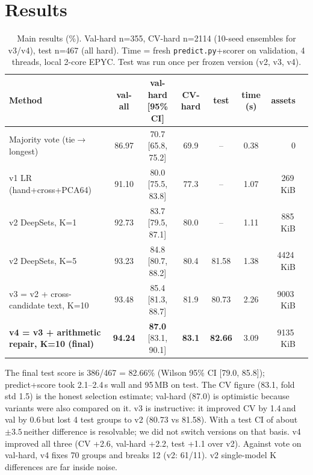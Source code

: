\documentclass[10pt,a4paper]{article}
\newcommand{\pt}{\,\text{pt}}
\begin{document}
\section{Results}
\begin{table}[h]\centering\small
\caption{Main results (\%). Val-hard n=355, CV-hard n=2114 (10-seed ensembles for v3/v4), test n=467 (all hard). Time = fresh \texttt{predict.py}+scorer on validation, 4 threads, local 2-core EPYC. Test was run once per frozen version (v2, v3, v4).}
\setlength{\tabcolsep}{4pt}\begin{tabular}{lcccccrr}\toprule
Method & val-all & val-hard [95\% CI] & CV-hard & test & time (s) & assets\\\midrule
Majority vote (tie$\to$longest) & 86.97 & 70.7 [65.8, 75.2] & 69.9 & -- & 0.38 & 0\\
v1 LR (hand+cross+PCA64) & 91.10 & 80.0 [75.5, 83.8] & 77.3 & -- & 1.07 & 269\,KiB\\
v2 DeepSets, K=1 & 92.73 & 83.7 [79.5, 87.1] & 80.0 & -- & 1.11 & 885\,KiB\\
v2 DeepSets, K=5 & 93.23 & 84.8 [80.7, 88.2] & 80.4 & 81.58 & 1.38 & 4424\,KiB\\
v3 = v2 + cross-candidate text, K=10 & 93.48 & 85.4 [81.3, 88.7] & 81.9 & 80.73 & 2.26 & 9003\,KiB\\
\textbf{v4 = v3 + arithmetic repair, K=10 (final)} & \textbf{94.24} & \textbf{87.0} [83.1, 90.1] & \textbf{83.1} & \textbf{82.66} & 3.09 & 9135\,KiB\\\bottomrule
\end{tabular}
\end{table}
The final test score is 386/467 = 82.66\% (Wilson 95\% CI [79.0, 85.8]); predict+score took 2.1--2.4\,s wall and 95\,MB on test. The CV figure (83.1, fold std 1.5) is the honest selection estimate; val-hard (87.0) is optimistic because variants were also compared on it. v3 is instructive: it improved CV by 1.4\pt and val by 0.6\pt but lost 4 test groups to v2 (80.73 vs 81.58). With a test CI of about $\pm3.5$\pt neither difference is resolvable; we did not switch versions on that basis. v4 improved all three (CV +2.6, val-hard +2.2, test +1.1 over v2). Against vote on val-hard, v4 fixes 70 groups and breaks 12 (v2: 61/11). v2 single-model K differences are far inside noise.
\end{document}
